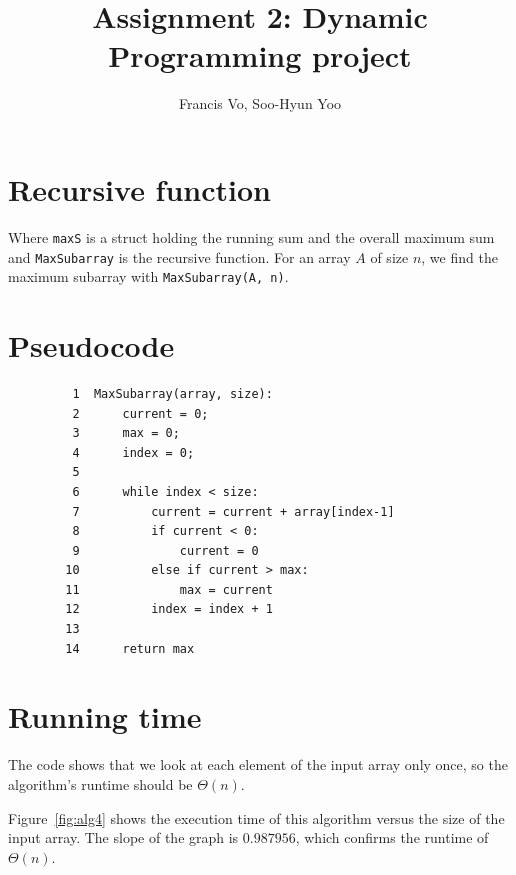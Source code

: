 \documentclass[letterpaper,10pt]{article}
\title{Assignment 2: Dynamic Programming project}
\author{Francis Vo, Soo-Hyun Yoo}
\begin{document}
	\maketitle

	\section{Recursive function}
		

		Where {\tt maxS} is a struct holding the running sum and the overall maximum sum and {\tt MaxSubarray} is the recursive function. For an array $A$ of size $n$, we find the maximum subarray with {\tt MaxSubarray(A, n)}.


	\section{Pseudocode}
		\begin{verbatim}
		 1  MaxSubarray(array, size):
		 2      current = 0;
		 3      max = 0;
		 4      index = 0;
		 5
		 6      while index < size:
		 7          current = current + array[index-1]
		 8          if current < 0:
		 9              current = 0
		10          else if current > max:
		11              max = current
		12          index = index + 1
		13
		14      return max
		\end{verbatim}


	\section{Running time}

		The code shows that we look at each element of the input array only once, so the algorithm's runtime should be $\Theta(n)$.

		Figure~\ref{fig:alg4} shows the execution time of this algorithm versus the size of the input array. The slope of the graph is $0.987956$, which confirms the runtime of $\Theta(n)$.
\end{document}
